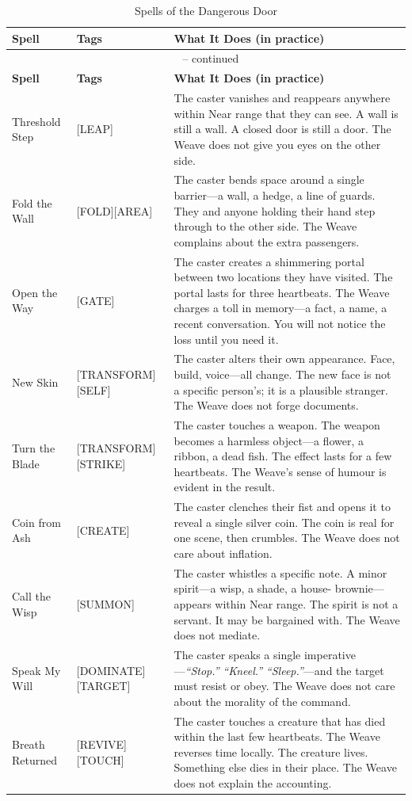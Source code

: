 \noindent
\begin{longtable}{p{} p{} p{}}
\caption{Spells of the Dangerous Door}\\
\midrule
\textbf{Spell} & \textbf{Tags} & \textbf{What It Does (in practice)}\\
\midrule
\endfirsthead
\multicolumn{3}{c}{\tablename\ \thetable{} -- continued}\\
\midrule
\textbf{Spell} & \textbf{Tags} & \textbf{What It Does (in practice)}\\
\midrule
\endhead
Threshold Step & [LEAP] & The caster vanishes and reappears anywhere within Near range that they can see. A wall is still a wall. A closed door is still a door. The Weave does not give you eyes on the other side. \\
Fold the Wall & [FOLD][AREA] & The caster bends space around a single barrier---a wall, a hedge, a line of guards. They and anyone holding their hand step through to the other side. The Weave complains about the extra passengers. \\
Open the Way & [GATE] & The caster creates a shimmering portal between two locations they have visited. The portal lasts for three heartbeats. The Weave charges a toll in memory---a fact, a name, a recent conversation. You will not notice the loss until you need it. \\
New Skin & [TRANSFORM][SELF] & The caster alters their own appearance. Face, build, voice---all change. The new face is not a specific person's; it is a plausible stranger. The Weave does not forge documents. \\
Turn the Blade & [TRANSFORM][STRIKE] & The caster touches a weapon. The weapon becomes a harmless object---a flower, a ribbon, a dead fish. The effect lasts for a few heartbeats. The Weave's sense of humour is evident in the result. \\
Coin from Ash & [CREATE] & The caster clenches their fist and opens it to reveal a single silver coin. The coin is real for one scene, then crumbles. The Weave does not care about inflation. \\
Call the Wisp & [SUMMON] & The caster whistles a specific note. A minor spirit---a wisp, a shade, a house- brownie---appears within Near range. The spirit is not a servant. It may be bargained with. The Weave does not mediate. \\
Speak My Will & [DOMINATE][TARGET] & The caster speaks a single imperative---\emph{``Stop.''} \emph{``Kneel.''} \emph{``Sleep.''}---and the target must resist or obey. The Weave does not care about the morality of the command. \\
Breath Returned & [REVIVE][TOUCH] & The caster touches a creature that has died within the last few heartbeats. The Weave reverses time locally. The creature lives. Something else dies in their place. The Weave does not explain the accounting. \\
\hline
\end{longtable}

